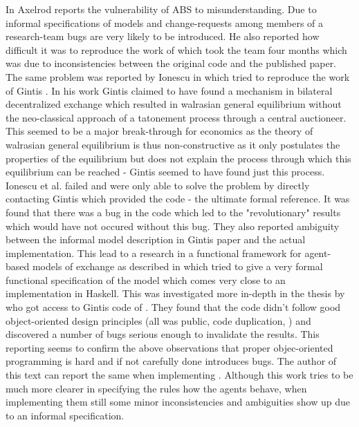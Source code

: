 In \cite{axelrod_chapter_2006} Axelrod reports the vulnerability of ABS to misunderstanding. Due to informal specifications of models and change-requests among members of a research-team bugs are very likely to be introduced. He also reported how difficult it was to reproduce the work of \cite{axelrod_convergence_1995} which took the team four months which was due to inconsistencies between the original code and the published paper. 
The same problem was reported by Ionescu in \cite{ionescu_dependently-typed_2012} which tried to reproduce the work of Gintis \cite{gintis_emergence_2006}. In his work Gintis claimed to have found a mechanism in bilateral decentralized exchange which resulted in walrasian general equilibrium without the neo-classical approach of a tatonement process through a central auctioneer. This seemed to be a major break-through for economics as the theory of walrasian general equilibrium is thus non-constructive as it only postulates the properties of the equilibrium \cite{colell_microeconomic_1995} but does not explain the process through which this equilibrium can be reached - Gintis seemed to have found just this process. Ionescu et al. \cite{ionescu_dependently-typed_2012} failed and were only able to solve the problem by directly contacting Gintis which provided the code - the ultimate formal reference. It was found that there was a bug in the code which led to the "revolutionary" results which would have not occured without this bug. They also reported ambiguity between the informal model description in Gintis paper and the actual implementation.
This lead to a research in a functional framework for agent-based models of exchange as described in \cite{botta_functional_2011} which tried to give a very formal functional specification of the model which comes very close to an implementation in Haskell.
This was investigated more in-depth in the thesis by \cite{evensen_extensible_2010} who got access to Gintis code of \cite{gintis_emergence_2006}. They found that the code didn't follow good object-oriented design principles (all was public, code duplication, ) and discovered a number of bugs serious enough to invalidate the results. This reporting seems to confirm the above observations that proper objec-oriented programming is hard and if not carefully done introduces bugs.
The author of this text can report the same when implementing \cite{epstein_growing_1996}. Although this work tries to be much more clearer in specifying the rules how the agents behave, when implementing them still some minor inconsistencies and ambiguities show up due to an informal specification.

